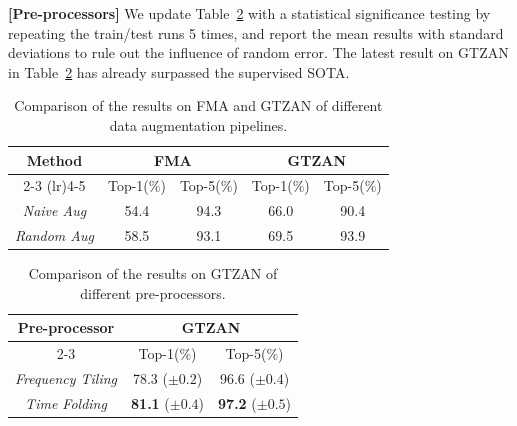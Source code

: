 \documentclass{article}
\begin{document}
\noindent\textbf{[Pre-processors]} We update Table~\ref{tab:pre_processor_new} with a statistical significance testing by repeating the train/test runs 5 times, and report the mean results with standard deviations to rule out the influence of random error. The latest result on GTZAN in Table~\ref{tab:pre_processor_new} has already surpassed the supervised SOTA.

\begin{table}[t]
\centering
\small 
\vspace{-0.3cm}
\begin{tabular}{ c | c c c c}
	\toprule
	\multirow{2}{*}[-0.7ex]{Method}  & \multicolumn{2}{c}{FMA} & \multicolumn{2}{c}{GTZAN} \\
    \cmidrule(lr){2-3} 
    \cmidrule(lr){4-5}
    & Top-1(\%) & Top-5(\%) & Top-1(\%) & Top-5(\%) \\
	\midrule
	\textit{Naive Aug} & 54.4 & 94.3 & 66.0 & 90.4\\
	\textit{Random Aug} & 58.5 & 93.1 & 69.5 & 93.9 \\
	\bottomrule
\end{tabular}
\vspace{-0.2cm}
\caption{Comparison of the results on FMA and GTZAN of different data augmentation pipelines.}
\label{tab:ablation_aug}
\end{table}

\begin{table}[t]
\centering
\setlength\tabcolsep{20pt}
\small 
\begin{tabular}{ c | c  c }
	\toprule
	\multirow{2}{*}[-0.7ex]{Pre-processor} & \multicolumn{2}{c}{GTZAN} \\
	\cmidrule(lr){2-3}
	& Top-1(\%) & Top-5(\%) \\
	\midrule
	\textit{Frequency Tiling} & 78.3 ($\pm{0.2}$) & 96.6 ($\pm{0.4}$) \\
    \textit{Time Folding} & \textbf{81.1} ($\pm{0.4}$) & \textbf{97.2} ($\pm{0.5}$) \\
	\bottomrule
\end{tabular}
\vspace{-0.2cm}
\caption{Comparison of the results on GTZAN of different pre-processors.}
\label{tab:pre_processor_new}
\vspace{-0.5cm}
\end{table}
\end{document}
